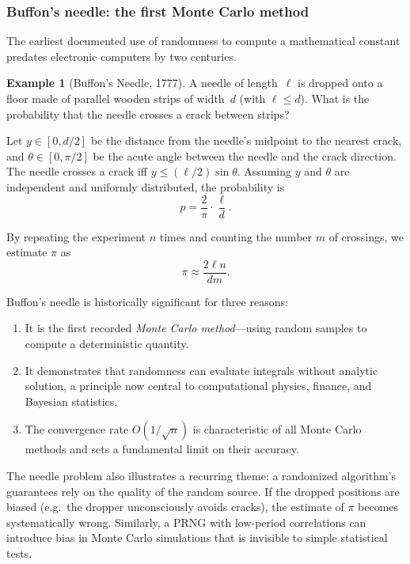 \documentclass[twoside,12pt]{book}
\theoremstyle{plain}
\theoremstyle{definition}
\newtheorem{example}[theorem]{Example}
\theoremstyle{remark}
\begin{document}
\subsubsection{Buffon's needle: the first Monte Carlo method}

The earliest documented use of randomness to compute a mathematical
constant predates electronic computers by two centuries.

\begin{example}[Buffon's Needle, 1777]
A needle of length~$\ell$ is dropped onto a floor made of parallel wooden
strips of width~$d$ (with $\ell \le d$). What is the probability that the
needle crosses a crack between strips?

Let $y \in [0, d/2]$ be the distance from the needle's midpoint to the
nearest crack, and $\theta \in [0, \pi/2]$ be the acute angle between the
needle and the crack direction. The needle crosses a crack iff
$y \le (\ell/2) \sin\theta$. Assuming $y$ and $\theta$ are independent and
uniformly distributed, the probability is
\[
  p = \frac{2}{\pi} \cdot \frac{\ell}{d}.
\]

By repeating the experiment $n$ times and counting the number $m$ of
crossings, we estimate $\pi$ as
\[
  \pi \approx \frac{2\ell n}{d m}.
\]
\end{example}

Buffon's needle is historically significant for three reasons:
\begin{enumerate}
\item It is the first recorded \emph{Monte Carlo method}---using random
samples to compute a deterministic quantity.
\item It demonstrates that randomness can evaluate integrals without
analytic solution, a principle now central to computational physics,
finance, and Bayesian statistics.
\item The convergence rate $O(1/\sqrt{n})$ is characteristic of all Monte
Carlo methods and sets a fundamental limit on their accuracy.
\end{enumerate}

The needle problem also illustrates a recurring theme: a randomized
algorithm's guarantees rely on the quality of the random source. If the
dropped positions are biased (e.g.\ the dropper unconsciously avoids
cracks), the estimate of $\pi$ becomes systematically wrong. Similarly, a
PRNG with low-period correlations can introduce bias in Monte Carlo
simulations that is invisible to simple statistical tests.
\end{document}
